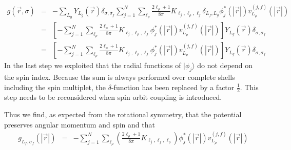 \documentclass[11pt,a4paper]{report}
\begin{document}
\begin{eqnarray*}
g(\vec{r},\sigma)
&=&-\sum_{L_g}Y_{L_g}(\vec{r})\delta_{\sigma,\sigma_f}
\sum_{j=1}^N
\sum_{\ell_\rho}\frac{2\ell_\rho+1}{8\pi}K_{\ell_j,\ell_\rho,\ell_f}\delta_{L_f,L_g}
\phi_j^*(|\vec{r}|)v_{L_\rho}^{(j,f)}(|\vec{r}|)
\\
&=&\left[-\sum_{j=1}^N
\sum_{\ell_\rho}\frac{2\ell_\rho+1}{8\pi}K_{\ell_j,\ell_\rho,\ell_f}
\phi_j^*(|\vec{r}|)v_{L_\rho}^{(j,f)}(|\vec{r}|)\right]
Y_{L_g}(\vec{r})\delta_{\sigma,\sigma_f}
\\
&=&\left[-\sum_{j=1}^N
\sum_{\ell_\rho}\frac{2\ell_\rho+1}{8\pi}K_{\ell_j,\ell_\rho,\ell_f}
\phi_j^*(|\vec{r}|)v_{L_\rho}^{(j,f)}(|\vec{r}|)\right]
Y_{L_g}(\vec{r})\delta_{\sigma,\sigma_f}
\end{eqnarray*}
In the last step we exploited that the radial functions of
$|\phi_j\rangle$ do not depend on the spin index. Because ths sum is
always performed over complete shells including the spin multiplet,
the $\delta$-function has been replaced by a factor $\frac{1}{2}$.
This step needs to be reconsidered when spin orbit coupling is
introduced.

Thus we find, as expected from the rotational symmetry, that the
potential preserves angular momentum and spin and that
\begin{eqnarray*}
g_{L_f,\sigma_f}(|\vec{r}|)&=&
-\sum_{j=1}^N
\sum_{\ell_\rho}
\left(\frac{2\ell_\rho+1}{8\pi}K_{\ell_j,\ell_f,\ell_\rho}\right)
\phi_j^*(|\vec{r}|) v_{L_\rho}^{(j,f)}(|\vec{r}|)
\end{eqnarray*}
\end{document}
